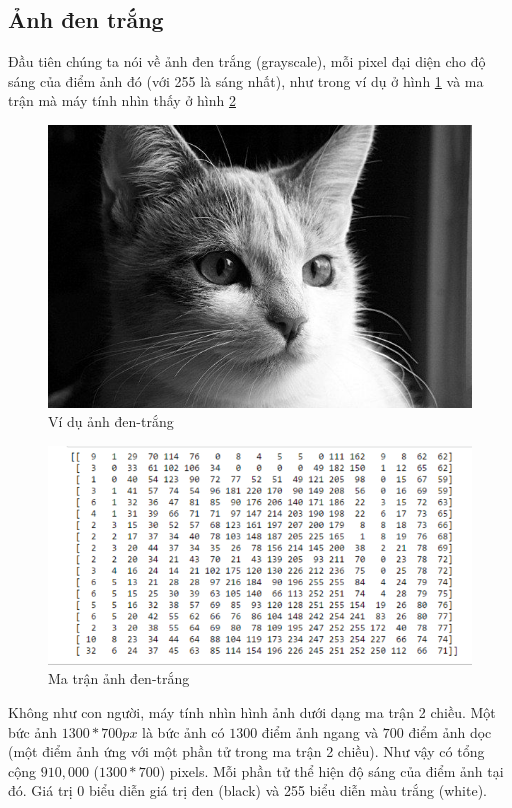\documentclass[a4paper]{report}
\begin{document}
\subsection*{Ảnh đen trắng}
Đầu tiên chúng ta nói về ảnh đen trắng (grayscale), mỗi pixel đại diện cho độ sáng của điểm ảnh đó (với 255 là sáng nhất), như trong ví dụ ở hình \ref{imgcat} và ma trận mà máy tính nhìn thấy ở hình \ref{imgmatrix}
\begin{figure}[H]
\centering
\includegraphics[scale=.4]{../images/fig/imgcat.jpg}
\caption{Ví dụ ảnh đen-trắng}
\label{imgcat}
\end{figure}
%
\begin{figure}[H]
\centering
\includegraphics[scale=.4]{../images/fig/matrix.png}
\caption{Ma trận ảnh đen-trắng}
\label{imgmatrix}
\end{figure}
\noindent
Không như con người, máy tính nhìn hình ảnh dưới dạng ma trận 2 chiều. Một bức ảnh $1300*700px$ là bức ảnh có $1300$ điểm ảnh ngang và $700$ điểm ảnh dọc (một điểm ảnh ứng với một phần tử trong ma trận 2 chiều). Như vậy có tổng cộng $910,000$ ($1300*700$) pixels. Mỗi phần tử thể hiện độ sáng của điểm ảnh tại đó. Giá trị 0 biểu diễn giá trị đen (black) và 255 biểu diễn màu trắng (white). 
\end{document}
